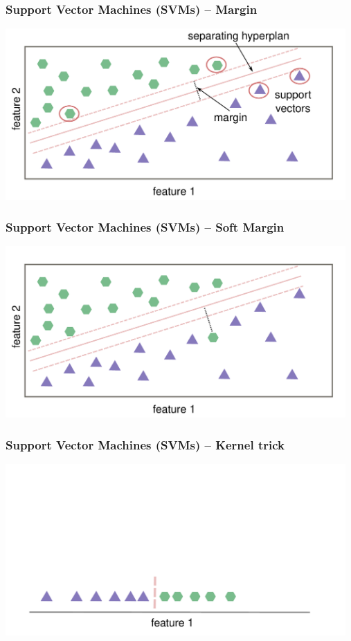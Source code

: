 \documentclass[aspectratio=169]{beamer}
\begin{document}
\begin{frame}
  \frametitle{Support Vector Machines (SVMs) -- Margin}
  \begin{center}
    \includegraphics[width=13.0cm]{images/svm_with_margin.pdf}
  \end{center}
\end{frame}

\begin{frame}
  \frametitle{Support Vector Machines (SVMs) -- Soft Margin}
  \begin{center}
    \includegraphics[width=13.0cm]{images/svm_with_soft_margin.pdf}
  \end{center}
\end{frame}

\begin{frame}
  \frametitle{Support Vector Machines (SVMs) -- Kernel trick}
  \begin{center}
    \includegraphics[width=13.0cm]{images/svm_kernel_trick_1.pdf}
  \end{center}
\end{frame}
\end{document}
